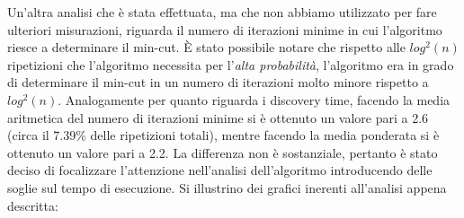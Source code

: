 Un'altra analisi che è stata effettuata, ma che non abbiamo utilizzato per fare ulteriori misurazioni, riguarda il numero di iterazioni minime in cui l'algoritmo  
riesce a determinare il min-cut. È stato possibile notare che rispetto alle $log^{2}(n)$ 
ripetizioni che l'algoritmo necessita per l'\textit{alta probabilità}, l'algoritmo 
era in grado di determinare il min-cut in un numero di iterazioni molto minore rispetto a 
$log^{2}(n)$. Analogamente per quanto riguarda i discovery time, facendo la media 
aritmetica del numero di iterazioni minime si è ottenuto un valore pari a 2.6 
(circa il 7.39\% delle ripetizioni totali), mentre facendo la media ponderata si è 
ottenuto un valore pari a 2.2. La differenza non è sostanziale, pertanto è stato 
deciso di focalizzare l'attenzione nell'analisi dell'algoritmo introducendo delle 
soglie sul tempo di esecuzione. Si illustrino dei grafici inerenti all'analisi appena 
descritta:

